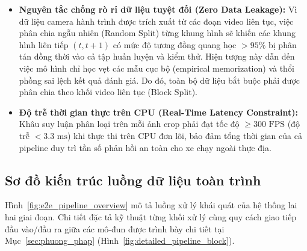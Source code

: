 \documentclass[a4paper, 11pt]{article}
\begin{document}
\begin{itemize}
    \item \textbf{Nguyên tắc chống rò rỉ dữ liệu tuyệt đối (Zero Data Leakage):} Vì dữ liệu camera hành trình được trích xuất từ các đoạn video liên tục, việc phân chia ngẫu nhiên (Random Split) từng khung hình sẽ khiến các khung hình liên tiếp $(t, t + 1)$ có mức độ tương đồng quang học $> 95\%$ bị phân tán đồng thời vào cả tập huấn luyện và kiểm thử. Hiện tượng này dẫn đến việc mô hình chỉ học vẹt các mẫu cục bộ (empirical memorization) và thổi phồng sai lệch kết quả đánh giá. Do đó, toàn bộ dữ liệu bắt buộc phải được phân chia theo khối video liên tục (Block Split).
    \item \textbf{Độ trễ thời gian thực trên CPU (Real-Time Latency Constraint):} Khâu suy luận phân loại trên mỗi ảnh crop phải đạt tốc độ $\ge 300\text{ FPS}$ (độ trễ $< 3.3\text{ ms}$) khi thực thi trên CPU đơn lõi, bảo đảm tổng thời gian của cả pipeline duy trì tần số phản hồi an toàn cho xe chạy ngoài thực địa.
\end{itemize}

\subsection{Sơ đồ kiến trúc luồng dữ liệu toàn trình}
\label{subsec:so_do_luong_du_lieu}

Hình~\ref{fig:e2e_pipeline_overview} mô tả luồng xử lý khái quát của hệ thống lai hai giai đoạn. Chi tiết đặc tả kỹ thuật từng khối xử lý cùng quy cách giao tiếp đầu vào/đầu ra giữa các mô-đun được trình bày chi tiết tại Mục~\ref{sec:phuong_phap} (Hình~\ref{fig:detailed_pipeline_block}).
\end{document}

